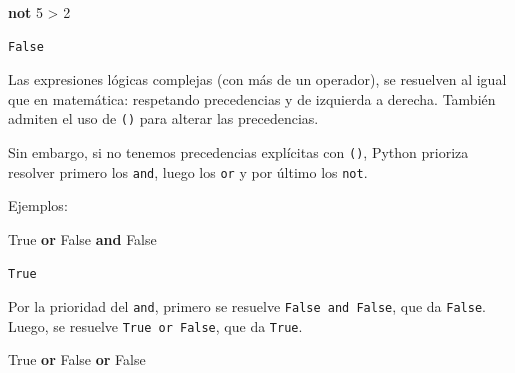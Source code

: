 \documentclass[
  letterpaper,
  DIV=11,
  numbers=noendperiod]{scrreprt}
\newenvironment{Shaded}{\begin{snugshade}}{\end{snugshade}}
\newcommand{\DecValTok}[1]{\textcolor[rgb]{0.68,0.00,0.00}{#1}}
\newcommand{\KeywordTok}[1]{\textcolor[rgb]{0.00,0.23,0.31}{\textbf{#1}}}
\newcommand{\OperatorTok}[1]{\textcolor[rgb]{0.37,0.37,0.37}{#1}}
\newcommand{\VariableTok}[1]{\textcolor[rgb]{0.07,0.07,0.07}{#1}}
\begin{document}
\begin{Shaded}
\begin{Highlighting}[]
\KeywordTok{not} \DecValTok{5} \OperatorTok{\textgreater{}} \DecValTok{2}
\end{Highlighting}
\end{Shaded}

\begin{verbatim}
False
\end{verbatim}

\begin{tcolorbox}[enhanced jigsaw, arc=.35mm, toptitle=1mm, colframe=quarto-callout-caution-color-frame, bottomtitle=1mm, opacitybacktitle=0.6, colbacktitle=quarto-callout-caution-color!10!white, leftrule=.75mm, coltitle=black, toprule=.15mm, titlerule=0mm, title=\textcolor{quarto-callout-caution-color}{\faFire}\hspace{0.5em}{Prioridad de Operadores}, bottomrule=.15mm, rightrule=.15mm, colback=white, breakable, opacityback=0, left=2mm]

Las expresiones lógicas complejas (con más de un operador), se resuelven
al igual que en matemática: respetando precedencias y de izquierda a
derecha. También admiten el uso de \texttt{()} para alterar las
precedencias.

Sin embargo, si no tenemos precedencias explícitas con \texttt{()},
Python prioriza resolver primero los \texttt{and}, luego los \texttt{or}
y por último los \texttt{not}.

Ejemplos:

\begin{Shaded}
\begin{Highlighting}[]
\VariableTok{True} \KeywordTok{or} \VariableTok{False} \KeywordTok{and} \VariableTok{False}
\end{Highlighting}
\end{Shaded}

\begin{verbatim}
True
\end{verbatim}

Por la prioridad del \texttt{and}, primero se resuelve
\texttt{False\ and\ False}, que da \texttt{False}. Luego, se resuelve
\texttt{True\ or\ False}, que da \texttt{True}.

\begin{Shaded}
\begin{Highlighting}[]
\VariableTok{True} \KeywordTok{or} \VariableTok{False} \KeywordTok{or} \VariableTok{False}
\end{Highlighting}
\end{Shaded}


\end{tcolorbox}
\end{document}
